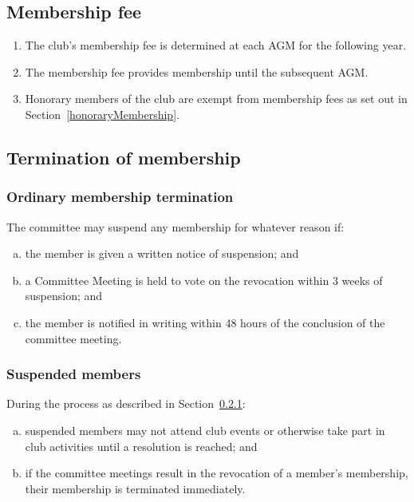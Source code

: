 \documentclass{constitution}
\begin{document}
\subsection{Membership fee}\label{membershipFee}
\begin{enumerate}[(1)]
    \item The club's membership fee is determined at each AGM for the following year.
    \item The membership fee provides membership until the subsequent AGM.
    \item Honorary members of the club are exempt from membership fees as set out in Section~\ref{honoraryMembership}.
\end{enumerate}

\subsection{Termination of membership}\label{terminationMembership}
\subsubsection{Ordinary membership termination}\label{ordinaryMembershipTerimnation}
The committee may suspend any membership for whatever reason if:
\begin{enumerate}[(a)]
    \item the member is given a written notice of suspension; and
    \item a Committee Meeting is held to vote on the revocation within 3 weeks of suspension; and
    \item the member is notified in writing within 48 hours of the conclusion of the committee meeting.
\end{enumerate}

\subsubsection{Suspended members}\label{suspendedMembers}
During the process as described in Section~\ref{ordinaryMembershipTerimnation}:
\begin{enumerate}[(a)]
    \item suspended members may not attend club events or otherwise take part in club activities until a resolution is reached; and
    \item if the committee meetings result in the revocation of a member's membership, their membership is terminated immediately.
\end{enumerate}
\end{document}
